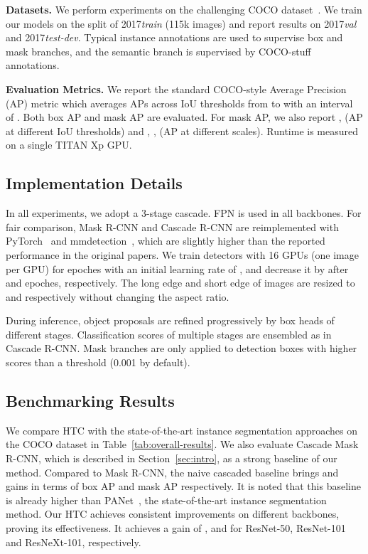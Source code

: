 \documentclass[10pt,twocolumn,letterpaper]{article}
\begin{document}
\noindent
\textbf{Datasets.}
We perform experiments on the challenging COCO dataset~\cite{lin2014microsoft}.
We train our models on the split of 2017\emph{train} (115k images)
and report results on 2017\emph{val} and 2017\emph{test-dev}.
Typical instance annotations are used to supervise box and mask branches,
and the semantic branch is supervised by COCO-stuff~\cite{caesar2018cvpr} annotations.

\noindent
\textbf{Evaluation Metrics.}
We report the standard COCO-style Average Precision (AP) metric which averages APs across IoU thresholds from  to  with an interval of .
Both box AP and mask AP are evaluated.
For mask AP, we also report ,  (AP at different IoU thresholds)
and , ,  (AP at different scales).
Runtime is measured on a single TITAN Xp GPU.

\subsection{Implementation Details}
In all experiments, we adopt a 3-stage cascade. FPN is used in all backbones.
For fair comparison, Mask R-CNN and Cascade R-CNN are reimplemented with PyTorch~\cite{paszke2017automatic} and mmdetection~\cite{mmdetection2018},
which are slightly higher than the reported performance in the original papers.
We train detectors with 16 GPUs (one image per GPU) for  epoches with an initial learning rate of ,
and decrease it by  after  and  epoches, respectively.
The long edge and short edge of images are resized to  and  respectively without changing the aspect ratio.

During inference, object proposals are refined progressively by box heads of different stages.
Classification scores of multiple stages are ensembled as in Cascade R-CNN.
Mask branches are only applied to detection boxes with higher scores than a threshold (0.001 by default).

\subsection{Benchmarking Results}

We compare HTC with the state-of-the-art instance segmentation approaches on the COCO dataset in Table~\ref{tab:overall-results}.
We also evaluate Cascade Mask R-CNN, which is described in Section~\ref{sec:intro}, as a strong baseline of our method.
Compared to Mask R-CNN, the naive cascaded baseline brings  and  gains in terms of box AP and mask AP respectively.
It is noted that this baseline is already higher than PANet~\cite{liu2018path}, the state-of-the-art instance segmentation method.
Our HTC achieves consistent improvements on different backbones, proving its effectiveness.
It achieves a gain of ,  and  for ResNet-50, ResNet-101 and ResNeXt-101, respectively.
\end{document}
